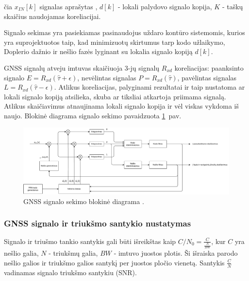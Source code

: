 \documentclass[main.tex]{subfiles}
\begin{document}
\noindent čia $x_{IN}[k]$ signalas aprašytas , $d[k]$ - lokali palydovo
signalo kopija, $K$ - taškų skaičius naudojamas koreliacijai.

Signalo sekimas yra pasiekiamas pasinaudojus uždaro kontūro sistemomis,
kurios yra su\-pro\-jek\-tuo\-tos taip, kad minimizuotų skirtumus tarp kodo užlaikymo,
Doplerio dažnio ir nešlio fazės lyginant su lokalia signalo kopiją $d[k]$.

GNSS signalų atveju imtuvas skaičiuoja 3-jų signalų $R_{xd}$ koreliacijas:
paanksinto signalo $E=R_{xd}(\hat{\tau} + \epsilon)$,
nevėlintas signalas $P=R_{xd}(\hat{\tau})$,
pavėlintas signalas $L=R_{xd}(\hat{\tau} - \epsilon)$.
Atlikus koreliacijas, palyginami rezultatai ir taip nustatoma
ar lokali signalo kopiją atsilieka, skuba ar tiksliai atkartoja
priimama signalą. Atlikus skaičiavimus atnaujinama lokali signalo kopija
ir vėl viskas vykdoma iš naujo. Blokinė diagrama signalo sekimo pavaidzuota
\ref{fig:gnss_sdr_tracking_block}~pav.

\begin{figure}[h]
    \begin{centering}
    \includegraphics[scale=0.5]{drawings/tracking_diagram}
    \par\end{centering}
    \protect\caption{\label{fig:gnss_sdr_tracking_block}GNSS signalo sekimo blokinė diagrama \cite{gnss_sdr_web}.}
\end{figure}

\subsubsection{GNSS signalo ir triukšmo santykio nustatymas}

Signalo ir triušmo tankio santykis gali būti išreikštas kaip $C/N_0 = \frac{C}{\frac{N}{BW}}$,
kur $C$ yra nešlio galia, $N$ - triukšmų galia, $BW$ - imtuvo juostos plotis.
Ši išraiska parodo nešlio galios ir triukšmo galios santykį per juostos pločio vienetą.
Santykis $\frac{C}{N}$ vadinamas signalo triukšmo santykiu (SNR).
\end{document}
